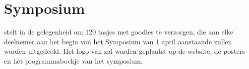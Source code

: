 \documentclass[a4paper]{contract}
\begin{document}
\section{Symposium}
\aes stelt \spons in de gelegenheid om 120 tasjes met goodies te
verzorgen, die aan elke deelnemer aan het begin van het Symposium
van 1 april aanstaande zullen worden uitgedeeld. Het logo van
\spons zal worden geplaatst op de website, de posters en het
programmaboekje van het symposium.
\\

\annulering
\end{document}
